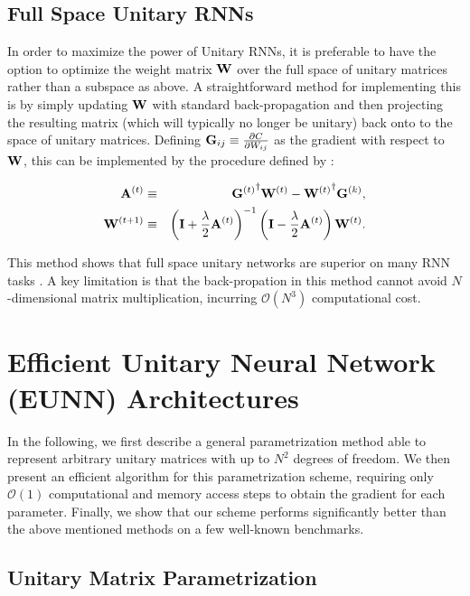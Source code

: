 \subsection{Full Space Unitary RNNs}

In order to maximize the power of Unitary RNNs, it is preferable to have the option to optimize the weight matrix ${\bf W}$ over the full space of unitary matrices rather than a subspace as above. A straightforward method for implementing this is by simply updating ${\bf W}$ with standard back-propagation and then projecting the resulting matrix (which will typically no longer be unitary) back onto to the space of unitary matrices. Defining ${\bf G}_{ij}\equiv\frac{\partial{C}}{\partial{W_{ij}}}$ as the gradient with respect to  ${\bf W}$, this can be implemented by the procedure defined by  \cite{wisdom2016full}:

\begin{eqnarray}
{\bf A}^{(t)} &\equiv&{{\bf G}^{(t)}}^{\dagger}{\bf W}^{(t)} - {{\bf W}^{(t)}}^{\dagger}{\bf G}^{(k)},\\
{\bf W}^{(t+1)} &\equiv& \left({\bf I}+\frac{\lambda}{2}{\bf A}^{(t)}\right)^{-1}\left({\bf I}-\frac{\lambda}{2}{\bf A}^{(t)}\right){\bf W}^{(t)}.
\end{eqnarray}

This method shows that full space unitary networks are superior on many RNN tasks \cite{wisdom2016full}. A key limitation is that the back-propation in this method cannot avoid $N$-dimensional matrix multiplication, incurring $\mathcal{O}(N^3)$ computational cost.

\section{Efficient Unitary Neural Network (EUNN) Architectures}

In the following, we first describe a general parametrization method able to represent arbitrary unitary matrices with up to $N^2$ degrees of freedom. We then present an efficient algorithm for this parametrization scheme, requiring only $\mathcal{O}(1)$ computational and memory access steps to obtain the gradient for each parameter. Finally, we show that our scheme performs significantly better than the above mentioned methods on a few well-known benchmarks.

\subsection{Unitary Matrix Parametrization}

